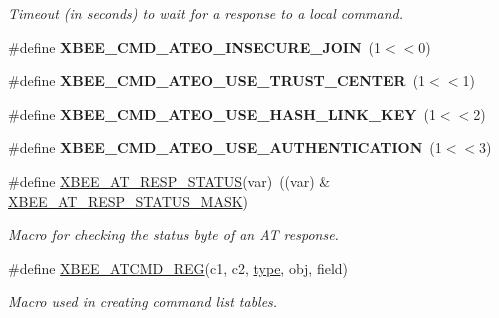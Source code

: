 \begin{DoxyCompactItemize}
\begin{DoxyCompactList}\small\item\em Timeout (in seconds) to wait for a response to a local command. \end{DoxyCompactList}\item 
\mbox{\label{group__xbee__atcmd_gaa5d4a48819eeef79e9552c6c139b73cf}} 
\#define {\bfseries X\+B\+E\+E\+\_\+\+C\+M\+D\+\_\+\+A\+T\+E\+O\+\_\+\+I\+N\+S\+E\+C\+U\+R\+E\+\_\+\+J\+O\+IN}~(1$<$$<$0)
\item 
\mbox{\label{group__xbee__atcmd_ga0aa3bb0ab5ac949a951778338d87356d}} 
\#define {\bfseries X\+B\+E\+E\+\_\+\+C\+M\+D\+\_\+\+A\+T\+E\+O\+\_\+\+U\+S\+E\+\_\+\+T\+R\+U\+S\+T\+\_\+\+C\+E\+N\+T\+ER}~(1$<$$<$1)
\item 
\mbox{\label{group__xbee__atcmd_ga203e29636f971bc1e5ca82d158eec447}} 
\#define {\bfseries X\+B\+E\+E\+\_\+\+C\+M\+D\+\_\+\+A\+T\+E\+O\+\_\+\+U\+S\+E\+\_\+\+H\+A\+S\+H\+\_\+\+L\+I\+N\+K\+\_\+\+K\+EY}~(1$<$$<$2)
\item 
\mbox{\label{group__xbee__atcmd_ga11bd61fb70eddd0996b67c3b45bed8d3}} 
\#define {\bfseries X\+B\+E\+E\+\_\+\+C\+M\+D\+\_\+\+A\+T\+E\+O\+\_\+\+U\+S\+E\+\_\+\+A\+U\+T\+H\+E\+N\+T\+I\+C\+A\+T\+I\+ON}~(1$<$$<$3)
\item 
\#define \hyperlink{group__xbee__atcmd_ga4dc292cd07dfd93bbfb2b8632b580949}{X\+B\+E\+E\+\_\+\+A\+T\+\_\+\+R\+E\+S\+P\+\_\+\+S\+T\+A\+T\+US}(var)~((var) \& \hyperlink{group__xbee__atcmd_ggac6a27f1b1ee32b75b6f966afbb347f22adb75bf991027151c1aa20a454e278145}{X\+B\+E\+E\+\_\+\+A\+T\+\_\+\+R\+E\+S\+P\+\_\+\+S\+T\+A\+T\+U\+S\+\_\+\+M\+A\+SK})
\begin{DoxyCompactList}\small\item\em Macro for checking the status byte of an AT response. \end{DoxyCompactList}\item 
\#define \hyperlink{group__xbee__atcmd_gaafe33c3d8ea48b42b25d1183eaf93071}{X\+B\+E\+E\+\_\+\+A\+T\+C\+M\+D\+\_\+\+R\+EG}(c1,  c2,  \hyperlink{group__zcl_ga1d127017fb298b889f4ba24752d08b8e}{type},  obj,  field)
\begin{DoxyCompactList}\small\item\em Macro used in creating command list tables. \end{DoxyCompactList}\item 

\end{DoxyCompactItemize}

